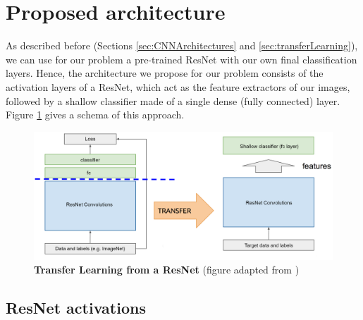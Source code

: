 

\section{Proposed architecture}\label{sec:dl_architecture}

As described before (Sections \ref{sec:CNNArchitectures} and \ref{sec:transferLearning}), we can use for our problem a pre-trained ResNet with our own final classification layers. Hence, the architecture we propose for our problem consists of the activation layers of a ResNet, which act as the feature extractors of our images, followed by a shallow classifier made of a single dense (fully connected) layer. Figure \ref{fig:transfer_learning} gives a schema of this approach.

\begin{figure}[h!]
	\centering
	\captionsetup{width=1\linewidth}
	\includegraphics[width=1\textwidth]{Figures/transfer_learning.png}
	\caption{\textbf{Transfer Learning from a ResNet} (figure adapted from \parencite{McGuinness2017})}
	\label{fig:transfer_learning}
\end{figure}

\subsection{ResNet activations}

